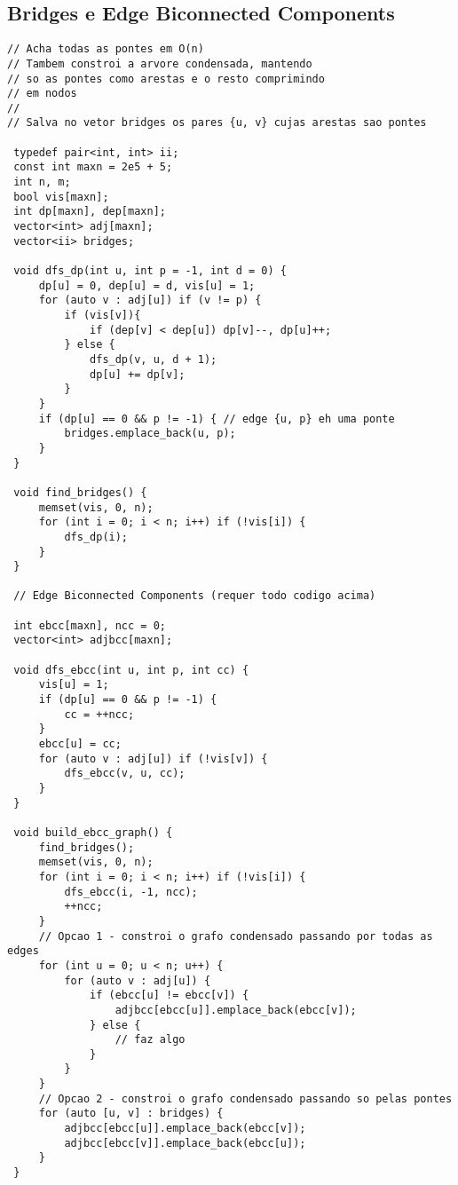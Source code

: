 \documentclass[11pt, a4paper, twoside]{article}
\begin{document}
\subsection{Bridges e Edge Biconnected Components}
\begin{lstlisting}
// Acha todas as pontes em O(n)
// Tambem constroi a arvore condensada, mantendo
// so as pontes como arestas e o resto comprimindo
// em nodos
//
// Salva no vetor bridges os pares {u, v} cujas arestas sao pontes

 typedef pair<int, int> ii;
 const int maxn = 2e5 + 5;
 int n, m;
 bool vis[maxn];
 int dp[maxn], dep[maxn];
 vector<int> adj[maxn];
 vector<ii> bridges;
 
 void dfs_dp(int u, int p = -1, int d = 0) {
     dp[u] = 0, dep[u] = d, vis[u] = 1;
     for (auto v : adj[u]) if (v != p) {
         if (vis[v]){
             if (dep[v] < dep[u]) dp[v]--, dp[u]++;
         } else {
             dfs_dp(v, u, d + 1);
             dp[u] += dp[v];
         }
     }
     if (dp[u] == 0 && p != -1) { // edge {u, p} eh uma ponte
         bridges.emplace_back(u, p);
     }
 }
 
 void find_bridges() {
     memset(vis, 0, n);
     for (int i = 0; i < n; i++) if (!vis[i]) {
         dfs_dp(i);
     }
 }
 
 // Edge Biconnected Components (requer todo codigo acima)
 
 int ebcc[maxn], ncc = 0;
 vector<int> adjbcc[maxn];
 
 void dfs_ebcc(int u, int p, int cc) {
     vis[u] = 1;
     if (dp[u] == 0 && p != -1) {
         cc = ++ncc;
     }
     ebcc[u] = cc;
     for (auto v : adj[u]) if (!vis[v]) {
         dfs_ebcc(v, u, cc);
     }
 }
 
 void build_ebcc_graph() {
     find_bridges();
     memset(vis, 0, n);
     for (int i = 0; i < n; i++) if (!vis[i]) {
         dfs_ebcc(i, -1, ncc);
         ++ncc;
     }
     // Opcao 1 - constroi o grafo condensado passando por todas as edges
     for (int u = 0; u < n; u++) {
         for (auto v : adj[u]) {
             if (ebcc[u] != ebcc[v]) {
                 adjbcc[ebcc[u]].emplace_back(ebcc[v]);
             } else {
                 // faz algo
             }
         }
     }
     // Opcao 2 - constroi o grafo condensado passando so pelas pontes
     for (auto [u, v] : bridges) {
         adjbcc[ebcc[u]].emplace_back(ebcc[v]);
         adjbcc[ebcc[v]].emplace_back(ebcc[u]);
     }
 }
\end{lstlisting}
\end{document}
